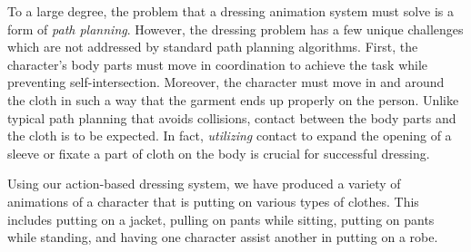 To a large degree, the problem that a dressing animation system must solve
is a form of \emph{path planning}.  However, the dressing problem has a
few unique challenges which are not addressed by standard path planning
algorithms. First, the character's body parts must move in coordination to
achieve the task while preventing self-intersection. Moreover, the
character must move in and around the cloth in such a way that the garment
ends up properly on the person. Unlike typical path planning that avoids
collisions, contact between the body parts and the cloth is to be
expected. In fact, \emph{utilizing} contact to expand the opening of a
sleeve or fixate a part of cloth on the body is crucial for
successful dressing.


Using our action-based dressing system, we have produced a variety of
animations of a character that is putting on various types of clothes.
This includes putting on a jacket, pulling on pants while sitting, putting
on pants while standing, and having one character assist another in
putting on a robe.


